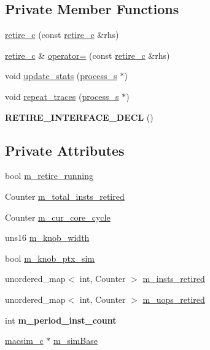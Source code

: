 \subsection*{Private Member Functions}
\begin{DoxyCompactItemize}
\item 
\hyperlink{classretire__c_a07e9117cffbab18595be92616ec1852b}{retire\_\-c} (const \hyperlink{classretire__c}{retire\_\-c} \&rhs)
\item 
\hyperlink{classretire__c}{retire\_\-c} \& \hyperlink{classretire__c_a4d74507c105952708d0b88ae198c456b}{operator=} (const \hyperlink{classretire__c}{retire\_\-c} \&rhs)
\item 
void \hyperlink{classretire__c_a20e4b31657c49da538d1360c060f7776}{update\_\-stats} (\hyperlink{structprocess__s}{process\_\-s} $\ast$)
\item 
void \hyperlink{classretire__c_aad999812f5d299edc5426613393b552e}{repeat\_\-traces} (\hyperlink{structprocess__s}{process\_\-s} $\ast$)
\item 
\hypertarget{classretire__c_af40a5cf3a5b9be53a30b37997db162bf}{
{\bfseries RETIRE\_\-INTERFACE\_\-DECL} ()}
\label{classretire__c_af40a5cf3a5b9be53a30b37997db162bf}

\end{DoxyCompactItemize}
\subsection*{Private Attributes}
\begin{DoxyCompactItemize}
\item 
bool \hyperlink{classretire__c_a440ae82fa7ace4028c64aae7abc24337}{m\_\-retire\_\-running}
\item 
Counter \hyperlink{classretire__c_a59114d1649ab7872ce25636b173353aa}{m\_\-total\_\-insts\_\-retired}
\item 
Counter \hyperlink{classretire__c_af58d8582170f634d4f021b76fd958b01}{m\_\-cur\_\-core\_\-cycle}
\item 
uns16 \hyperlink{classretire__c_ae0cb9e43818642ff68a1565004cd3080}{m\_\-knob\_\-width}
\item 
bool \hyperlink{classretire__c_a08f7427294d9f9d709beb52d33e98f41}{m\_\-knob\_\-ptx\_\-sim}
\item 
unordered\_\-map$<$ int, Counter $>$ \hyperlink{classretire__c_a84318556bf044a1c3bdbd08f61fe2d3a}{m\_\-insts\_\-retired}
\item 
unordered\_\-map$<$ int, Counter $>$ \hyperlink{classretire__c_a5e284ce1f986ab38f7d337e2dc7d3977}{m\_\-uops\_\-retired}
\item 
\hypertarget{classretire__c_a7ce9fe24f3b01a20eed2f7195cdc6f9c}{
int {\bfseries m\_\-period\_\-inst\_\-count}}
\label{classretire__c_a7ce9fe24f3b01a20eed2f7195cdc6f9c}

\item 
\hyperlink{classmacsim__c}{macsim\_\-c} $\ast$ \hyperlink{classretire__c_a373e6acbae9c640abe0cfeaf54c0be53}{m\_\-simBase}
\end{DoxyCompactItemize}


